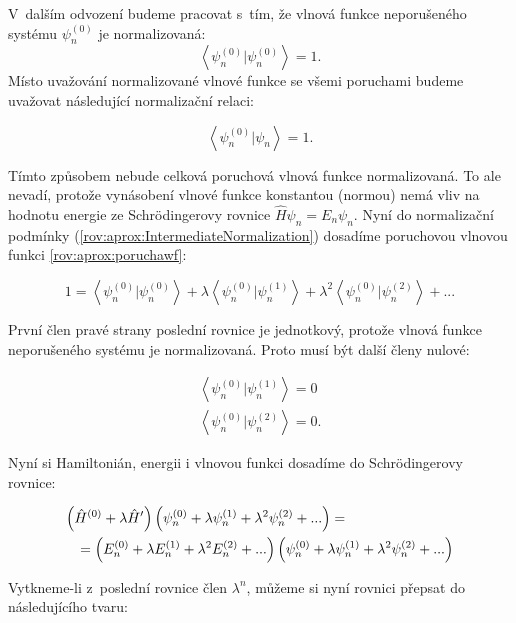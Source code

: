 V~dalším odvození budeme pracovat s~tím, že vlnová funkce neporušeného systému $\psi^{(0)}_n$ je normalizovaná:
\begin{equation}
\left <\psi^{(0)}_n |\psi^{(0)}_n\right >=1.
\end{equation}
Místo uvažování normalizované vlnové funkce se všemi poruchami budeme uvažovat následující normalizační relaci:

\begin{equation}
\left <\psi^{(0)}_n |\psi_n\right >=1.
\label{rov:aprox:IntermediateNormalization}
\end{equation}

\noindent Tímto způsobem nebude celková poruchová vlnová funkce normalizovaná. To ale nevadí, protože vynásobení vlnové funkce konstantou (normou) nemá vliv na hodnotu energie ze Schrödingerovy rovnice $ \hat{H}\psi_n=E_n\psi_n $. Nyní do normalizační podmínky (\ref{rov:aprox:IntermediateNormalization}) dosadíme poruchovou vlnovou funkci \ref{rov:aprox:poruchawf}:

\begin{equation}
1=\left <\psi^{(0)}_n |\psi^{(0)}_n \right >+
\lambda \left <\psi^{(0)}_n |\psi^{(1)}_n \right >+
\lambda^2 \left <\psi^{(0)}_n |\psi^{(2)}_n \right > + ...
\end{equation}

První člen pravé strany poslední rovnice je jednotkový, protože vlnová funkce neporušeného systému je normalizovaná. Proto musí být další členy nulové:

\begin{eqnarray}
\left <\psi^{(0)}_n |\psi^{(1)}_n \right >=0\\
\left <\psi^{(0)}_n |\psi^{(2)}_n \right >=0. 
\end{eqnarray}

\noindent Nyní si Hamiltonián, energii i vlnovou funkci dosadíme do Schrödingerovy rovnice:

\begin{eqnarray}
\lefteqn{ \left(\hat{H}^{(0)}+\lambda \hat{H}'\right)\left(\psi^{(0)}_{n}+\lambda \psi^{(1)}_{n}+\lambda^2 \psi^{(2)}_{n}+...\right)=}
\nonumber\\
&&=\left(E^{(0)}_{n}+\lambda E^{(1)}_{n}+\lambda^2 E^{(2)}_{n}+...\right)\left(\psi^{(0)}_{n}+\lambda \psi^{(1)}_{n}+\lambda^2 \psi^{(2)}_{n}+...\right)
\end{eqnarray}

\noindent Vytkneme-li z~poslední rovnice člen $\lambda^n$, můžeme si nyní rovnici přepsat do následujícího tvaru:

